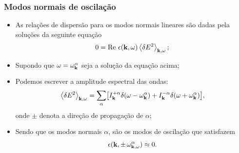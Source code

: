 \documentclass[10pt,aspectratio=1610,lualatex]{beamer}
\begin{document}
\begin{frame}
  \frametitle{Modos normais de oscilação}
  \begin{itemize}
    \item As relações de dispersão para os modos normais lineares
    são dadas pela soluções da seguinte equação
    \begin{equation}
      0=\mbox{Re}\ \epsilon({\bf k},\omega)
      \left<\delta E^2 \right>_{{\bf k},\omega};
      \label{real-lin}
    \end{equation}
    \vspace{-0.6cm}
    \pause
    \item Supondo que $\omega=\omega^{\alpha}_{\bf k}$ seja a solução
    da equação acima;
    \vspace{0.2cm}
    \pause
    \item Podemos escrever a amplitude espectral das ondas:
    \begin{equation}
      \left<\delta E^2\right>_{{\bf k},\omega}
      =\sum_{\alpha}\bigl[I^{+\alpha}_{\bf k}
      \delta(\omega-\omega_{\bf k}^{\alpha})
      +I^{-\alpha}_{\bf k} \delta(\omega+\omega_{\bf k}^{\alpha})\bigr],
      \label{wave-dens}
    \end{equation}
    onde $\pm$ denota a direção de propagação de $\alpha$;
    \vspace{0.2cm}
    \pause
    \item Sendo que os modos normais $\alpha$, são os modos de
    oscilação que satisfazem
    \begin{equation}
      \label{eigenmode}
      \epsilon({\bf k,\pm\, \omega_{{\bf k},\omega}^\alpha}) \approx 0.
    \end{equation}
  \end{itemize}
\end{frame}
\end{document}

